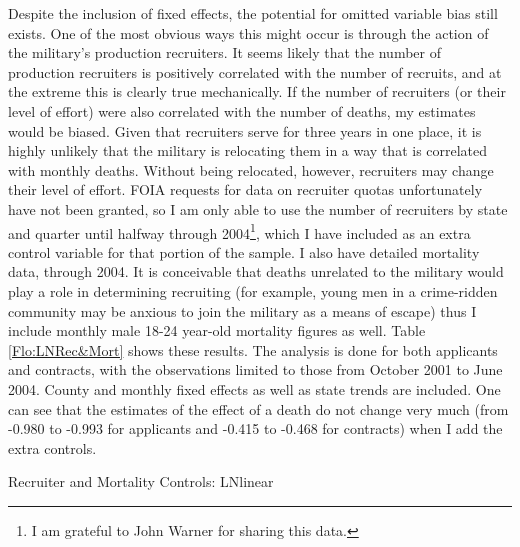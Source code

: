 \documentclass[12pt] {article}
\begin{document}
Despite the inclusion of fixed effects, the potential for omitted
variable bias still exists. One of the most obvious ways this might
occur is through the action of the military's production recruiters.
It seems likely that the number of production recruiters is positively
correlated with the number of recruits, and at the extreme this is
clearly true mechanically. If the number of recruiters (or their level
of effort) were also correlated with the number of deaths, my estimates
would be biased. Given that recruiters serve for three years in one
place, it is highly unlikely that the military is relocating them
in a way that is correlated with monthly deaths. Without being relocated,
however, recruiters may change their level of effort. FOIA requests for data on recruiter quotas unfortunately have not been granted, so I am only able to use the number of recruiters by state and quarter until halfway through 2004\footnote{I am grateful to John Warner for sharing this data.}, which I have included as an extra control variable for that portion of the sample. I also have detailed mortality data, through 2004. It is conceivable that deaths unrelated to
the military would play a role in determining recruiting (for example,
young men in a crime-ridden community may be anxious to join the military
as a means of escape) thus I include monthly male 18-24 year-old mortality figures
as well. Table \ref{Flo:LNRec&Mort} shows these results. The
analysis is done for both applicants and contracts, with the observations
limited to those from October 2001 to June 2004. County and monthly
fixed effects as well as state trends are included. One can see that
the estimates of the effect of a death do not change very much (from
-0.980 to -0.993 for applicants and -0.415 to -0.468 for contracts)
when I add the extra controls. %
\
\begin{table}
\caption{Recruiter and Mortality Controls: LNlinear}
\label{Flo:LNRec&Mort}
\end{table}
\end{document}

